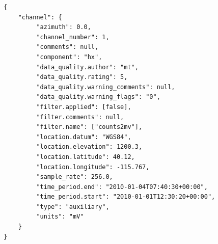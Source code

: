 \documentclass{article}
\begin{document}
\begin{verbatim}
{
    "channel": {
         "azimuth": 0.0,
         "channel_number": 1,
         "comments": null,
         "component": "hx",
         "data_quality.author": "mt",
         "data_quality.rating": 5,
         "data_quality.warning_comments": null,
         "data_quality.warning_flags": "0",
         "filter.applied": [false],
         "filter.comments": null,
         "filter.name": ["counts2mv"],
         "location.datum": "WGS84",
         "location.elevation": 1200.3,
         "location.latitude": 40.12,
         "location.longitude": -115.767,
         "sample_rate": 256.0,
         "time_period.end": "2010-01-04T07:40:30+00:00",
         "time_period.start": "2010-01-01T12:30:20+00:00",
         "type": "auxiliary",
         "units": "mV"
    }
}
\end{verbatim}
\end{document}
